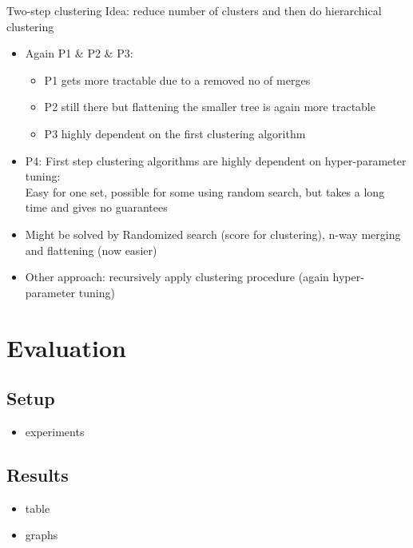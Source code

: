\documentclass[rgb]{beamer}
\begin{document}
    \begin{frame}{Two-step clustering}
        Idea: reduce number of clusters and then do hierarchical clustering
            \begin{itemize}
                \item Again P1 \& P2 \& P3: 
                \begin{itemize}
                    \item P1 gets more tractable due to a removed no of merges
                    \item P2 still there but flattening the smaller tree is again more tractable
                    \item P3 highly dependent on the first clustering algorithm
                \end{itemize}
                \item P4: First step clustering algorithms are highly dependent on hyper-parameter tuning: \\
                Easy for one set, possible for some using random search, but takes a long time and gives no guarantees
                \item Might be solved by Randomized search (score for clustering), n-way merging and flattening (now easier)
                \item Other approach: recursively apply clustering procedure (again hyper-parameter tuning)
            \end{itemize}
        \end{frame}

\section{Evaluation}
    \subsection{Setup}
        \begin{frame}
        \subsectionpage
            \begin{itemize}
                \item experiments
            \end{itemize}
        \end{frame}{}

    \subsection{Results}
        \begin{frame}
        \subsectionpage
            \begin{itemize}
                \item table
                \item graphs
            
            \end{itemize}
        \end{frame}{}
\end{document}
